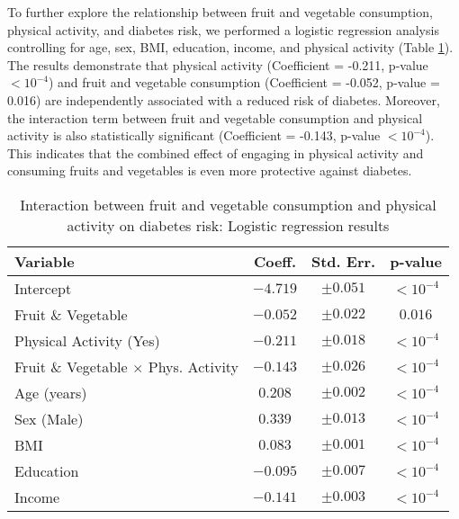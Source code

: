 \documentclass[11pt]{article}
\begin{document}
To further explore the relationship between fruit and vegetable consumption, physical activity, and diabetes risk, we performed a logistic regression analysis controlling for age, sex, BMI, education, income, and physical activity (Table \ref{table3}). The results demonstrate that physical activity (Coefficient = -0.211, p-value $<10^{-4}$) and fruit and vegetable consumption (Coefficient = -0.052, p-value = 0.016) are independently associated with a reduced risk of diabetes. Moreover, the interaction term between fruit and vegetable consumption and physical activity is also statistically significant (Coefficient = -0.143, p-value $<10^{-4}$). This indicates that the combined effect of engaging in physical activity and consuming fruits and vegetables is even more protective against diabetes.\begin{table}[!htbp]
\centering
\caption{Interaction between fruit and vegetable consumption and physical activity on diabetes risk: Logistic regression results}
\label{table3}
\begin{tabular}{l c c c}
\toprule
\textbf{Variable}                        & \textbf{Coeff.} & \textbf{Std. Err.} & \textbf{p-value} \\
\midrule
Intercept                                & $-4.719$       & $\pm 0.051$        & $<10^{-4}$    \\
Fruit \& Vegetable                      & $-0.052$       & $\pm 0.022$        & $0.016$       \\
Physical Activity (Yes)                  & $-0.211$       & $\pm 0.018$        & $<10^{-4}$    \\
Fruit \& Vegetable $\times$ Phys. Activity & $-0.143$       & $\pm 0.026$        & $<10^{-4}$    \\
Age (years)                              & $0.208$        & $\pm 0.002$        & $<10^{-4}$    \\
Sex (Male)                               & $0.339$        & $\pm 0.013$        & $<10^{-4}$    \\
BMI                                      & $0.083$        & $\pm 0.001$        & $<10^{-4}$    \\
Education                                & $-0.095$       & $\pm 0.007$        & $<10^{-4}$    \\
Income                                   & $-0.141$       & $\pm 0.003$        & $<10^{-4}$    \\
\bottomrule
\end{tabular}
\end{table}
\end{document}
